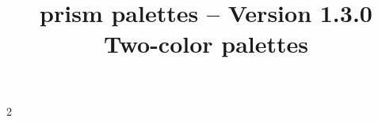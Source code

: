 \documentclass{tutodoc}
\title{\raisebox{-.20ex}{@}prism palettes -- Version 1.3.0\\ Two-color palettes}
\date{}
\begin{document}
\maketitle{}

{
  \setlength{\columnsep}{2cm}
  \setlength{\columnseprule}{0.4pt}

  \begin{multicols}{2}
    \tableofcontents
  \end{multicols}
}

\newpage


















\end{document}
